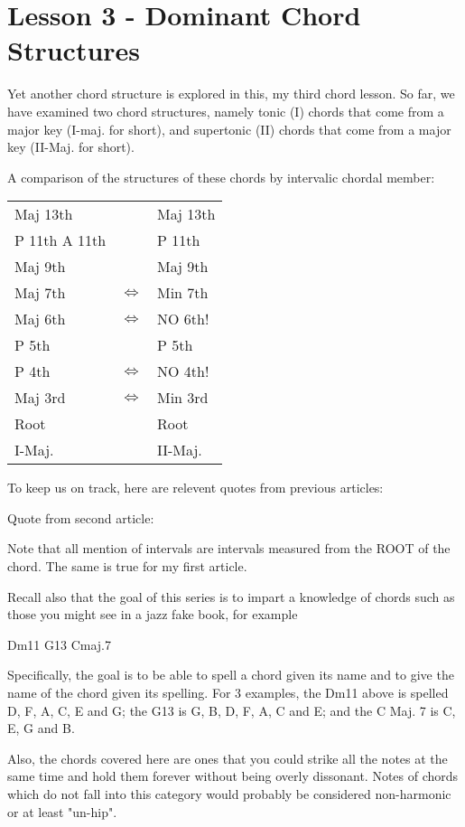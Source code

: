 \section{Lesson 3 - Dominant Chord Structures}

Yet another chord structure is explored in this, my third chord lesson.
So far, we have examined two chord structures, namely tonic (I) chords
that come from a major key (I-maj. for short), and supertonic (II) 
chords that come from a major key (II-Maj. for short).

A comparison of the structures of these chords by intervalic chordal member:

\begin{tabular}{ | l c l | }
	\hline
	Maj 13th					&					& Maj 13th				\\
	P 11th   A 11th   & 				& P 11th					\\
	Maj 9th           & 				& Maj 9th					\\
	Maj 7th    				& $\iff$	& Min 7th					\\
	Maj 6th						& $\iff$	& NO 6th!					\\
	P 5th             & 				& P 5th						\\
	P 4th							& $\iff$	& NO 4th!					\\
	Maj 3rd						& $\iff$	& Min 3rd					\\
	Root              & 				& Root						\\
	\hline
  I-Maj.            & 				& II-Maj.					\\
  \hline
\end{tabular}

To keep us on track, here are relevent quotes from previous articles:

Quote from second article:

Note that all mention of intervals are intervals measured from the ROOT
of the chord. The same is true for my first article.

Recall also that the goal of this series is to impart a knowledge of
chords such as those you might see in a jazz fake book, for example

Dm11     G13     Cmaj.7

Specifically, the goal is to be able to spell a chord given its name and
to give the name of the chord given its spelling. For 3 examples, the
Dm11 above is spelled D, F, A, C, E and G; the G13 is G, B, D, F, A, C
and E; and the C Maj. 7 is C, E, G and B.

Also, the chords covered here are ones that you could strike all the
notes at the same time and hold them forever without being overly
dissonant. Notes of chords which do not fall into this category would
probably be considered non-harmonic or at least "un-hip".


